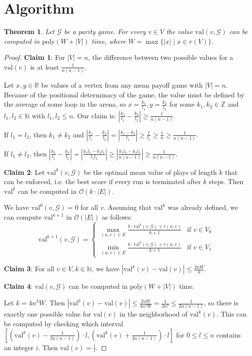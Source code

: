 \documentclass{article}
\newtheorem{theorem}{Theorem}
\begin{document}
\section{Algorithm}
\begin{theorem}
\label{thm:alg_vals}
	Let $\mathcal{G}$ be a parity game. For every $v \in V$ the value $\text{val}(v, \mathcal{G})$ can be computed in $\text{poly}(W + |V|)$ time, where $W = \max \{ |x| \mid x \in r(V) \}$.
\end{theorem}
\begin{proof}
\textbf{Claim 1}: For $|V| = n$, the difference between two possible values for a $\text{val}(v)$ is at least $\frac{1}{n(n-1)}$. 

Let $x, y \in \mathbb{R}$ be values of a vertex from any mean payoff game with $|V| = n$. Because of the positional determinacy of the game, the value must be defined by the average of some loop in the arena, so $x = \frac{k_1}{l_1}, y = \frac{k_2}{l_2}$ for some $k_1, k_2 \in \mathbb{Z}$ and $l_1, l_2 \in \mathbb{N}$ with $l_1, l_2 \leq n$. Our claim is: $|\frac{k_1}{l_1} - \frac{k_2}{l_2}| \geq \frac{1}{n(n-1)}$.

If $l_1 = l_2$, then $k_1 \neq k_2$ and $|\frac{k_1}{l_1} - \frac{k_2}{l_2}| = |\frac{k_1 - k_2}{l_1}| \geq \frac{1}{l_1} \geq \frac{1}{n} \geq \frac{1}{n(n-1)}$.

If $l_1 \neq l_2$, then $|\frac{k_1}{l_1} - \frac{k_2}{l_2}| = |\frac{k_1 l_2 - k_2 l_1}{l_1 l_2}| \geq |\frac{k_1 l_2 - k_2 l_1}{n (n-1)}| \geq \frac{1}{n (n-1)}$.

\textbf{Claim 2}: Let $\text{val}^k(v, \mathcal{G})$ be the optimal mean value of plays of length $k$ that can be enforced, i.e. the best score if every run is terminated after $k$ steps. Then $\text{val}^k$ can be computed in $\mathcal{O}(k \cdot |E|)$.

We have $\text{val}^0(v, \mathcal{G}) = 0$ for all $v$. Assuming that $\text{val}^k$ was already defined, we can compute $\text{val}^{k+1}$ in $\mathcal{O}(|E|)$ as follows:
$$\text{val}^{k+1}(v, \mathcal{G}) = \begin{cases}
	\max\limits_{(u,v) \in E} \frac{k \cdot \text{val}^k(v, \mathcal{G}) + r(u, v)}{k+1} & \text{if } v \in V_0 \\
	\min\limits_{(u,v) \in E} \frac{k \cdot \text{val}^k(v, \mathcal{G}) + r(u, v)}{k+1} & \text{if } v \in V_1
\end{cases}$$

\textbf{Claim 3}: For all $v \in V, k \in \mathbb{N}$, we have $|\text{val}^k(v) - \text{val}(v)| \leq \frac{2nW}{k}$. %

\textbf{Claim 4}: $\text{val}(v, \mathcal{G})$ can be computed in $\text{poly}(W + |V|)$ time.

Let $k = 4n^3W$. Then $|\text{val}^k(v) - \text{val}(v)| \leq \frac{2nW}{4n^3W} = \frac{1}{2 n^2} \leq \frac{1}{2n(n-1)}$, so there is exactly one possible value for $\text{val}(v)$ in the neighborhood of $\text{val}^k(v)$. This can be computed by checking which interval $[(\text{val}^k(v) - \frac{1}{2n(n-1)}) \cdot l, (\text{val}^k(v) + \frac{1}{2n(n-1)}) \cdot l]$ for $0 \leq l \leq n$ contains an integer $i$. Then $\text{val}(v) = \frac{i}{l}$.
\end{proof}
\end{document}
